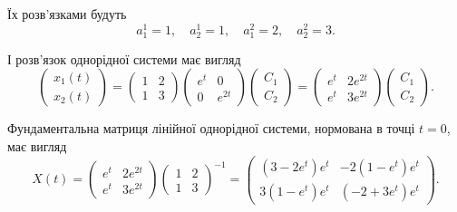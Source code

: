 \begin{solution}
	Їх розв'язками будуть
	\begin{equation*}
		a_1^1 = 1, \quad a_2^1 = 1, \quad a_1^2 = 2, \quad a_2^2 = 3.
	\end{equation*}

	І розв'язок однорідної системи має вигляд
	\begin{equation*}
		\begin{pmatrix} x_1(t) \\ x_2(t) \end{pmatrix} = \begin{pmatrix} 1 & 2 \\ 1 & 3 \end{pmatrix} \begin{pmatrix} e^t & 0 \\ 0 & e^{2 t} \end{pmatrix} \begin{pmatrix} C_1 \\ C_2 \end{pmatrix} = \begin{pmatrix} e^t & 2 e^{2 t} \\ e^t & 3 e^{2t} \end{pmatrix} \begin{pmatrix} C_1 \\ C_2 \end{pmatrix}.
	\end{equation*}

	Фундаментальна матриця лінійної однорідної системи, нормована в точці $t = 0$, має вигляд
	\begin{equation*}
		X(t) = \begin{pmatrix} e^t & 2 e^{2 t} \\ e^t & 3 e^{2t} \end{pmatrix} \begin{pmatrix} 1 & 2 \\ 1 & 3 \end{pmatrix}^{-1} = \begin{pmatrix} (3 - 2 e^t) e^t & -2 (1 - e^t) e^t \\ 3 (1 - e^t) e^t & (-2 + 3 e^t) e^t \end{pmatrix}.
	\end{equation*}


\end{solution}
